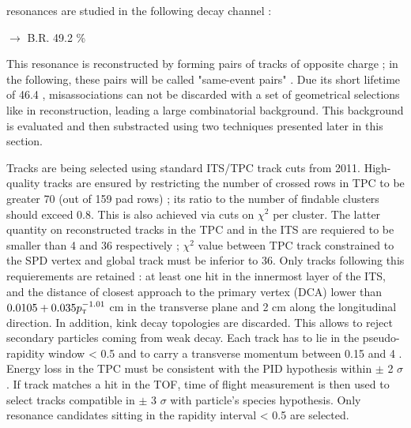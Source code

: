 \rmPhiMes resonances are studied in the following decay channel :

\rmPhiMes [$s\bar{s}$] $\rightarrow$ \Kplus [$u\bar{s}$] \Kminus [$\bar{u} s$]  \qquad \textsc{B.R. 49.2 \%}

This resonance is reconstructed by forming pairs of tracks of opposite charge ; in the following, these pairs will be called "same-event pairs" . Due its short lifetime of 46.4 \fm \cite{noauthor_pdglive_nodate}, misassociations can not be discarded with a set of geometrical selections like in \rmOmega reconstruction, leading a large combinatorial background. This background is evaluated and then substracted using two techniques presented later in this section.

Tracks are being selected using standard ITS/TPC track cuts from 2011. High-quality tracks are ensured by restricting the number of crossed rows in TPC to be greater 70 (out of 159 pad rows) ; its ratio to the number of findable clusters should exceed 0.8. This is also achieved via cuts on $\chi^2$ per cluster. The latter  quantity on reconstructed tracks in the TPC and in the ITS are requiered to be smaller than 4 and 36 respectively ; $\chi^2$ value between TPC track constrained to the SPD vertex and global track must be inferior to 36. Only tracks following this requierements are retained : at least one hit in the innermost layer of the ITS, and the distance of closest approach to the primary vertex (DCA) lower than $0.0105 + 0.035 p_{\text{\textsc{t}}}^{-1.01}$ cm in the transverse plane and 2 cm along the longitudinal direction. In addition, kink decay topologies are discarded. This allows to reject secondary particles coming from weak decay. Each track has to lie in the pseudo-rapidity window \abspseudorap < 0.5 and to carry a transverse momentum between 0.15 and 4 \gmom. Energy loss in the TPC must be consistent with the PID hypothesis within $\pm$ 2 $\sigma$. If track matches a hit in the TOF, time of flight measurement is then used to select tracks compatible in $\pm$ 3 $\sigma$ with particle's species hypothesis.
Only resonance candidates sitting in the rapidity interval \absrap < 0.5 are selected. 

